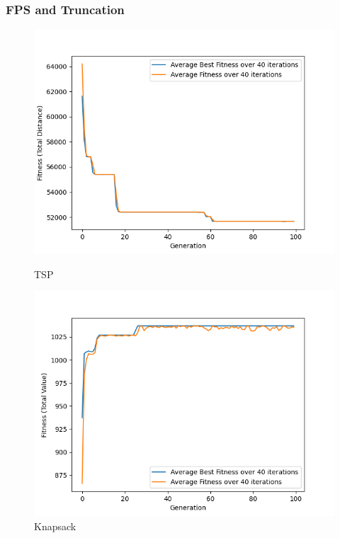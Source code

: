 \documentclass[11pt, letterpaper]{article}
\begin{document}
\subsubsection {FPS and Truncation}
\begin{figure}[H]
  \includegraphics[width=\linewidth]{images/tsp_fp_tr.png}
  \caption{TSP}
\endminipage\hfill
{}
  \includegraphics[width=\linewidth]{images/knapsack_fp_tr.png}
  \caption{Knapsack}
\endminipage\hfill
{}%

\end{figure}
\end{document}
